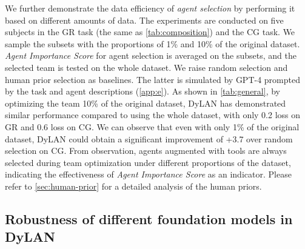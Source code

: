 \documentclass{article} %
\begin{document}
We further demonstrate the data efficiency of \textit{agent selection} by performing it based on different amounts of data. The experiments are conducted on five subjects in the GR task (the same as \cref{tab:composition}) and the CG task.
We sample the subsets with the proportions of 1\% and 10\% of the original dataset. \textit{Agent Importance Score} for agent selection is averaged on the subsets, and the selected team is tested on the whole dataset. We raise random selection and human prior selection as baselines. The latter is simulated by GPT-4 prompted by the task and agent descriptions (\cref{app:e}).
As shown in \cref{tab:general}, by optimizing the team 10\% of the original dataset, DyLAN has demonstrated similar performance compared to using the whole dataset, with only \textcolor{mydarkgreen}{0.2} loss on GR and \textcolor{mydarkgreen}{0.6} loss on CG. 
We can observe that even with only 1\% of the original dataset, DyLAN could obtain a significant improvement of \textcolor{mydarkgreen}{+3.7} over random selection on CG. From observation, agents augmented with tools are always selected during team optimization under different proportions of the dataset, indicating the effectiveness of \textit{Agent Importance Score} as an indicator. Please refer to \cref{sec:human-prior} for a detailed analysis of the human priors.


\subsection{Robustness of different foundation models in DyLAN}
\end{document}
